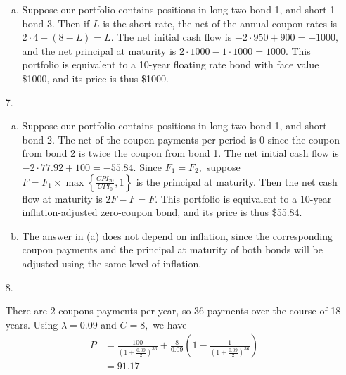 \documentclass{article}
\begin{document}
\begin{enumerate}
\begin{enumerate}[(a)]
			\item 
				\begin{soln}
					Suppose our portfolio contains positions in long two bond 1, and short 1 bond 3. Then if $L$ is the short rate, the net of the annual coupon rates is $2\cdot 4 - (8-L) = L.$ The net initial cash flow is $-2\cdot 950 + 900 = -1000,$ and the net principal at maturity is $2\cdot 1000 - 1\cdot 1000 = 1000.$ This portfolio is equivalent to a 10-year floating rate bond with face value \$1000, and its price is thus \$1000.
				\end{soln}
				
		\end{enumerate}

	\item[7.]
		\begin{enumerate}[(a)]
			\item 
				\begin{soln}
					Suppose our portfolio contains positions in long two bond 1, and short bond 2. The net of the coupon payments per period is 0 since the coupon from bond 2 is twice the coupon from bond 1. The net initial cash flow is $-2\cdot 77.92 + 100 = -55.84.$ Since $F_1=F_2,$ suppose $F=F_1\times\max\left\{ \frac{CPI_{20}}{CPI_0}, 1 \right\}$ is the principal at maturity. Then the net cash flow at maturity is $2F-F=F.$ This portfolio is equivalent to a 10-year inflation-adjusted zero-coupon bond, and its price is thus \$55.84.
				\end{soln}

			\item
				\begin{soln}
					The answer in (a) does not depend on inflation, since the corresponding coupon payments and the principal at maturity of both bonds will be adjusted using the same level of inflation.
				\end{soln}
				
		\end{enumerate}

	\item[8.]
		\begin{soln}
			There are 2 coupons payments per year, so 36 payments over the course of 18 years. Using $\lambda=0.09$ and $C=8,$ we have
			\begin{align*}
				P &= \frac{100}{\left( 1+\frac{0.09}{2} \right)^{36}} + \frac{8}{0.09}\left( 1-\frac{1}{\left( 1+\frac{0.09}{2} \right)^{36}} \right) \\
				&= 91.17
			\end{align*}
		\end{soln}


\end{enumerate}
\end{document}
